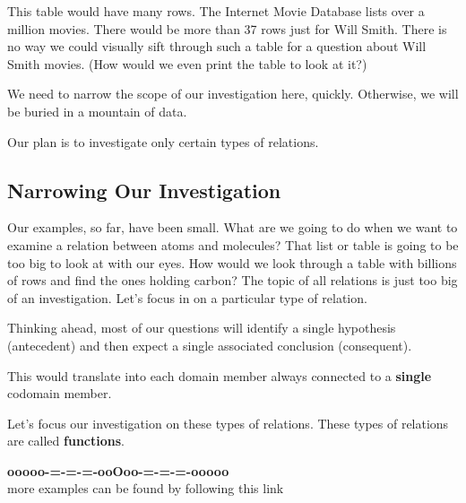 \documentclass{ximera}
\begin{document}
This table would have many rows. The Internet Movie Database lists over a million movies.  There would be more than 37 rows just for Will Smith. There is no way we could visually sift through such a table for a question about Will Smith movies. (How would we even print the table to look at it?)

We need to narrow the scope of our investigation here, quickly. Otherwise, we will be buried in a mountain of data.

Our plan is to investigate only certain types of relations.








\subsection*{Narrowing Our Investigation}


Our examples, so far, have been small.  What are we going to do when we want to examine a relation between atoms and molecules?  That list or table is going to be too big to look at with our eyes.  How would we look through a table with billions of rows and find the ones holding carbon?  The topic of all relations is just too big of an investigation. Let's focus in on a particular type of relation.

Thinking ahead, most of our questions will identify a single hypothesis (antecedent) and then expect a single associated conclusion (consequent).

This would translate into each domain member always connected to a \textbf{\textcolor{purple!85!blue}{single}} codomain member.

Let's focus our investigation on these types of relations.  These types of relations are called \textbf{\textcolor{purple!85!blue}{functions}}.













\begin{onlineOnly}
\begin{center}
\textbf{\textcolor{green!50!black}{ooooo-=-=-=-ooOoo-=-=-=-ooooo}} \\

more examples can be found by following this link\\ 

\end{center}
\end{onlineOnly}
\end{document}
